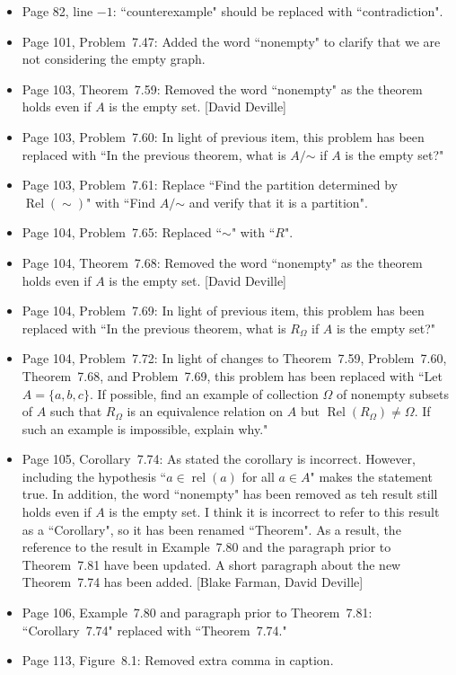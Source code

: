 \documentclass[11pt]{article}%
\DeclareMathOperator{\rel}{rel}
\newcommand{\Rel}{\operatorname{Rel}}
\begin{document}
\begin{itemize}
\item Page 82, line $-1$: ``counterexample" should be replaced with ``contradiction". 
\item Page 101, Problem~7.47: Added the word ``nonempty" to clarify that we are not considering the empty graph.
\item Page 103, Theorem~7.59: Removed the word ``nonempty" as the theorem holds even if $A$ is the empty set. [David Deville]
\item Page 103, Problem~7.60: In light of previous item, this problem has been replaced  with ``In the previous theorem, what is $A/\mathord\sim$ if $A$ is the empty set?"
\item Page 103, Problem~7.61: Replace ``Find the partition determined by $\Rel(\sim)$" with ``Find $A/\mathord\sim$ and verify that it is a partition".
\item Page 104, Problem~7.65: Replaced ``$\sim$" with ``$R$".
\item Page 104, Theorem~7.68: Removed the word ``nonempty" as the theorem holds even if $A$ is the empty set. [David Deville]
\item Page 104, Problem~7.69: In light of previous item, this problem has been replaced  with ``In the previous theorem, what is $R_{\Omega}$ if $A$ is the empty set?"
\item Page 104, Problem~7.72: In light of changes to Theorem~7.59, Problem~7.60, Theorem~7.68, and Problem~7.69, this problem has been replaced  with ``Let $A=\{a,b,c\}$. If possible, find an example of collection $\Omega$ of nonempty subsets of $A$ such that $R_{\Omega}$ is an equivalence relation on $A$ but $\Rel(R_{\Omega})\neq \Omega$.  If such an example is impossible, explain why."
\item Page 105, Corollary~7.74: As stated the corollary is incorrect. However, including the hypothesis ``$a\in\rel(a)$ for all $a\in A$" makes the statement true. In addition, the word ``nonempty" has been removed as teh result still holds even if $A$ is the empty set. I think it is incorrect to refer to this result as a ``Corollary", so it has been renamed ``Theorem". As a result, the reference to the result in Example~7.80 and the paragraph prior to Theorem~7.81 have been updated. A short paragraph about the new Theorem~7.74 has been added. [Blake Farman, David Deville]
\item Page 106, Example~7.80 and paragraph prior to Theorem~7.81: ``Corollary~7.74" replaced with ``Theorem~7.74."
\item Page 113, Figure~8.1: Removed extra comma in caption.

\end{itemize}
\end{document}
